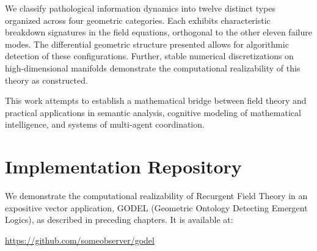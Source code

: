 \documentclass[11pt, a4paper]{report}
\begin{document}
We classify pathological information dynamics into twelve distinct types organized across four geometric categories. Each exhibits characteristic breakdown signatures in the field equations, orthogonal to the other eleven failure modes. The differential geometric structure presented allows for algorithmic detection of these configurations. Further, stable numerical discretizations on high-dimensional manifolds demonstrate the computational realizability of this theory as constructed.

\vspace{1em}

This work attempts to establish a mathematical bridge between field theory and practical applications in semantic analysis, cognitive modeling of mathematical intelligence, and systems of multi-agent coordination.

\tableofcontents


















\appendix
\chapter{Implementation Repository}
\label{appendix:implementation}

We demonstrate the computational realizability of Recurgent Field Theory in an expositive vector application, GODEL (Geometric Ontology Detecting Emergent Logics), as described in preceding chapters. It is available at:

\begin{center}
\url{https://github.com/someobserver/godel}
\end{center}
\end{document}
